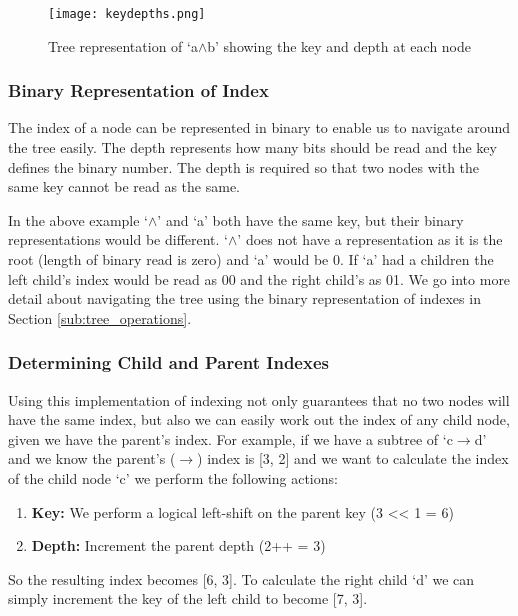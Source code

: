 \documentclass{report}
\begin{document}
\begin{figure}[ht]
    \centering
    \texttt{[image: keydepths.png]}
    \caption{Tree representation of `a$\land$b' showing the key and depth at each node}
    \label{keydepths}
\end{figure}

\subsubsection{Binary Representation of Index}

The index of a node can be represented in binary to enable us to navigate around the tree easily. The depth represents how many bits should be read and the key defines the binary number. The depth is required so that two nodes with the same key cannot be read as the same. 

In the above example `$\land$' and `a' both have the same key, but their binary representations would be different. `$\land$' does not have a representation as it is the root (length of binary read is zero) and `a' would be 0. If `a' had a children the left child's index would be read as 00 and the right child's as 01. We go into more detail about navigating the tree using the binary representation of indexes in Section \ref{sub:tree_operations}.

\subsubsection{Determining Child and Parent Indexes}

Using this implementation of indexing not only guarantees that no two nodes will have the same index, but also we can easily work out the index of any child node, given we have the parent's index. For example, if we have a subtree of `c$\to$d' and we know the parent's ($\to$) index is [3, 2] and we want to calculate the index of the child node `c' we perform the following actions:

\begin{enumerate}
    \item \textbf{Key:} We perform a logical left-shift on the parent key (3 << 1 = 6)
    \item \textbf{Depth:} Increment the parent depth (2++ = 3)
\end{enumerate}

So the resulting index becomes [6, 3]. To calculate the right child `d' we can simply increment the key of the left child to become [7, 3].
\end{document}
